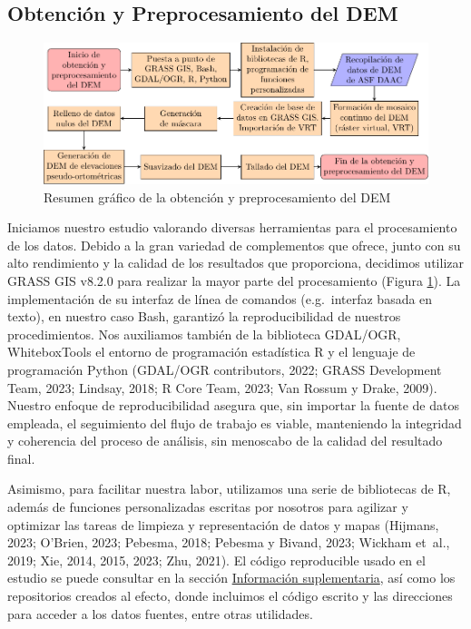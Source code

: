 \documentclass[spanish]{article}
\begin{document}
\hypertarget{obtenciuxf3n-y-preprocesamiento-del-dem}{%
\subsection{Obtención y Preprocesamiento del
DEM}\label{obtenciuxf3n-y-preprocesamiento-del-dem}}

\begin{figure}[H]

{\centering \includegraphics[width=0.8\linewidth]{resumen-obtencion-preprocesamiento-dem} 

}

\caption{Resumen gráfico de la obtención y preprocesamiento del DEM}\label{fig:obtencionpreprocdem}
\end{figure}

Iniciamos nuestro estudio valorando diversas herramientas para el
procesamiento de los datos. Debido a la gran variedad de complementos
que ofrece, junto con su alto rendimiento y la calidad de los resultados
que proporciona, decidimos utilizar GRASS GIS v8.2.0 para realizar la
mayor parte del procesamiento (Figura \ref{fig:obtencionpreprocdem}). La
implementación de su interfaz de línea de comandos (e.g.~interfaz basada
en texto), en nuestro caso Bash, garantizó la reproducibilidad de
nuestros procedimientos. Nos auxiliamos también de la biblioteca
GDAL/OGR, WhiteboxTools el entorno de programación estadística R y el
lenguaje de programación Python (GDAL/OGR contributors, 2022; GRASS
Development Team, 2023; Lindsay, 2018; R Core Team, 2023; Van Rossum y
Drake, 2009). Nuestro enfoque de reproducibilidad asegura que, sin
importar la fuente de datos empleada, el seguimiento del flujo de
trabajo es viable, manteniendo la integridad y coherencia del proceso de
análisis, sin menoscabo de la calidad del resultado final.

Asimismo, para facilitar nuestra labor, utilizamos una serie de
bibliotecas de R, además de funciones personalizadas escritas por
nosotros para agilizar y optimizar las tareas de limpieza y
representación de datos y mapas (Hijmans, 2023; O'Brien, 2023; Pebesma,
2018; Pebesma y Bivand, 2023; Wickham et~al., 2019; Xie, 2014, 2015,
2023; Zhu, 2021). El código reproducible usado en el estudio se puede
consultar en la sección \protect\hyperlink{infosupl}{Información
suplementaria}, así como los repositorios creados al efecto, donde
incluimos el código escrito y las direcciones para acceder a los datos
fuentes, entre otras utilidades.
\end{document}
